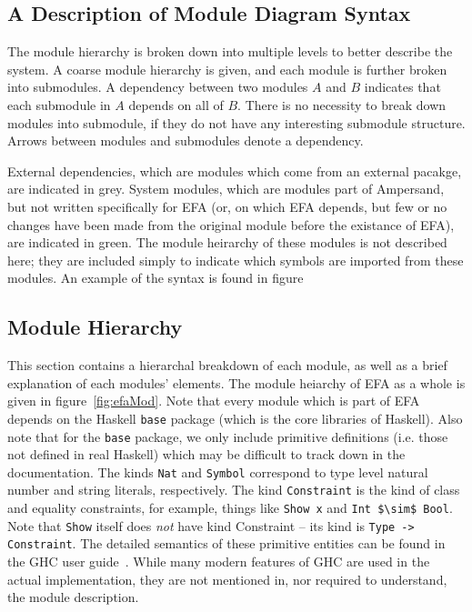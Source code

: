 \subsection{A Description of Module Diagram Syntax}\label{subsec:ModuleSyntax}

The module hierarchy is broken down into multiple levels to better describe the
system.  A coarse module hierarchy is given, and each module is further broken
into submodules.  A dependency between two modules $A$ and $B$ indicates that
each submodule in $A$ depends on all of $B$. There is no necessity to break
down modules into submodule, if they do not have any interesting submodule 
structure. Arrows between modules and submodules denote a dependency. 

External dependencies, which are modules which come from an external pacakge,
are indicated in {\color{grey}grey}. System modules, which are modules part of
Ampersand, but not written specifically for EFA (or, on which EFA depends, but
few or no changes have been made from the original module before the existance
of EFA), are indicated in {\color{applegreen}green}. The module heirarchy of
these modules is not described here; they are included simply to indicate which
symbols are imported from these modules. An example of the syntax is found in
figure%

\subsection{Module Hierarchy}

This section contains a hierarchal breakdown of each module, as well as a brief
explanation of each modules' elements. The module heiarchy of EFA as a whole is 
given in figure~\ref{fig:efaMod}.  Note
that every module which is part of EFA depends on the Haskell \texttt{base} 
package
(which is the core libraries of Haskell). Also note that for the \texttt{base}
package, we only include primitive definitions (i.e. those not defined in real
Haskell) which may be difficult to track down in the documentation. The kinds
\lstinline{Nat} and \lstinline{Symbol} correspond to type level natural number 
and string
literals, respectively. The kind \lstinline{Constraint} is the kind of class and
equality constraints, for example, things like \lstinline{Show x} and 
\lstinline[mathescape]|Int $\sim$ Bool|.  
Note that \texttt{Show} itself does \emph{not} have kind Constraint --
its kind is \lstinline{Type -> Constraint}. The detailed semantics of these
primitive entities can be found in the GHC user guide~\cite{ghcUserGuide}. While
many modern features of GHC are used in the actual implementation, they are not
mentioned in, nor required to understand, the module description.

